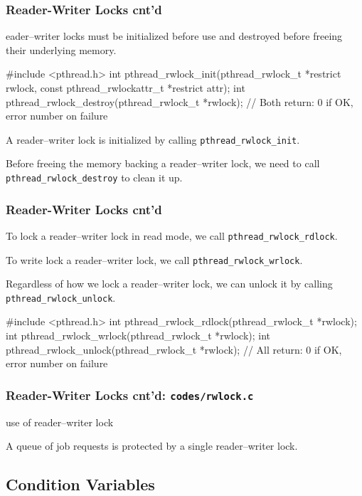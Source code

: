 \documentclass[newPxFont,sthlmFooter,nooffset]{beamer}
\begin{document}
\begin{frame}[t,fragile]
  \frametitle{Reader-Writer Locks cnt'd}
eader–writer locks must be initialized before use and destroyed before freeing their underlying memory.

\begin{codedef}
#include <pthread.h>
int pthread_rwlock_init(pthread_rwlock_t *restrict rwlock,
                        const pthread_rwlockattr_t *restrict attr); 
int pthread_rwlock_destroy(pthread_rwlock_t *rwlock);
// Both return: 0 if OK, error number on failure
\end{codedef}
A reader–writer lock is initialized by calling \texttt{pthread\_rwlock\_init}. 

Before freeing the memory backing a reader–writer lock, we need to call \texttt{pthread\_rwlock\_destroy} to clean it up.
\end{frame}


\begin{frame}[t, fragile]
  \frametitle{Reader-Writer Locks cnt'd}
To lock a reader–writer lock in read mode, we call \texttt{pthread\_rwlock\_rdlock}. 

To write lock a reader–writer lock, we call \texttt{pthread\_rwlock\_wrlock}.

Regardless of how we lock a reader–writer lock, we can unlock it by calling \texttt{pthread\_rwlock\_unlock}.

\begin{codedef}
#include <pthread.h>
int pthread_rwlock_rdlock(pthread_rwlock_t *rwlock); 
int pthread_rwlock_wrlock(pthread_rwlock_t *rwlock); 
int pthread_rwlock_unlock(pthread_rwlock_t *rwlock);
// All return: 0 if OK, error number on failure    
\end{codedef}
\end{frame}


\begin{frame}
  \frametitle{Reader-Writer Locks cnt'd: \texttt{codes/rwlock.c}}
use of reader–writer lock

A queue of job requests is protected by a single reader–writer lock.

  
\end{frame}



\subsection{Condition Variables}
\end{document}

